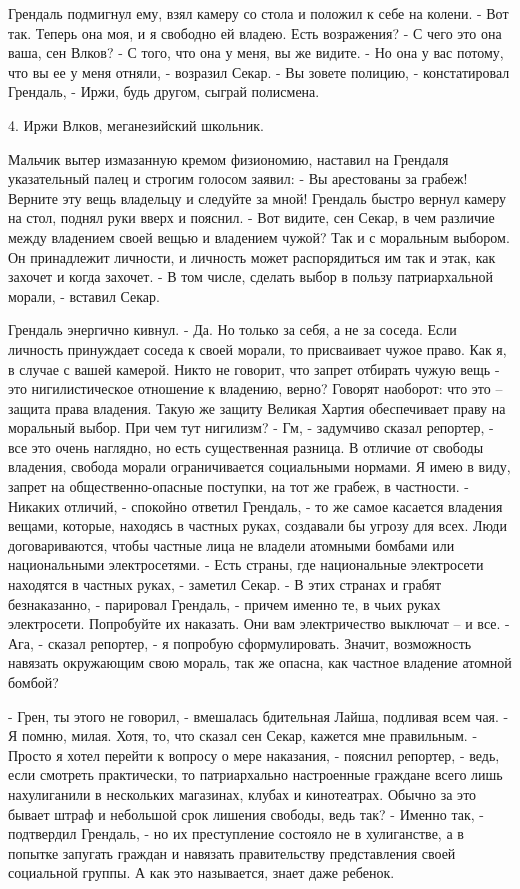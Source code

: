 \documentclass{book}
\begin{document}
Грендаль подмигнул ему, взял камеру со стола и положил к себе на колени.
- Вот так. Теперь она моя, и я свободно ей владею. Есть возражения?
- С чего это она ваша, сен Влков?
- С того, что она у меня, вы же видите.
- Но она у вас потому, что вы ее у меня отняли, - возразил Секар.
- Вы зовете полицию, - констатировал Грендаль, - Иржи, будь другом, сыграй полисмена.


4. Иржи Влков, меганезийский школьник.


Мальчик вытер измазанную кремом физиономию, наставил на Грендаля указательный палец и строгим голосом заявил:
- Вы арестованы за грабеж! Верните эту вещь владельцу и следуйте за мной!
Грендаль быстро вернул камеру на стол, поднял руки вверх и пояснил.
- Вот видите, сен Секар, в чем различие между владением своей вещью и владением чужой? Так и с моральным выбором. Он принадлежит личности, и личность может распорядиться им так и этак, как захочет и когда захочет.
- В том числе, сделать выбор в пользу патриархальной морали, - вставил Секар.

Грендаль энергично кивнул.
- Да. Но только за себя, а не за соседа. Если личность принуждает соседа к своей морали, то присваивает чужое право. Как я, в случае с вашей камерой. Никто не говорит, что запрет отбирать чужую вещь - это нигилистическое отношение к владению, верно? Говорят наоборот: что это -- защита права владения. Такую же защиту Великая Хартия обеспечивает праву на моральный выбор. При чем тут нигилизм?
- Гм, - задумчиво сказал репортер, - все это очень наглядно, но есть существенная разница. В отличие от свободы владения, свобода морали ограничивается социальными нормами. Я имею в виду, запрет на общественно-опасные поступки, на тот же грабеж, в частности.
- Никаких отличий, - спокойно ответил Грендаль, - то же самое касается владения вещами, которые, находясь в частных руках, создавали бы угрозу для всех. Люди договариваются, чтобы частные лица не владели атомными бомбами или национальными электросетями.
- Есть страны, где национальные электросети находятся в частных руках, - заметил Секар.
- В этих странах и грабят безнаказанно, - парировал Грендаль, - причем именно те, в чьих руках электросети. Попробуйте их наказать. Они вам электричество выключат -- и все.
- Ага, - сказал репортер, - я попробую сформулировать. Значит, возможность навязать окружающим свою мораль, так же опасна, как частное владение атомной бомбой?

- Грен, ты этого не говорил, - вмешалась бдительная Лайша, подливая всем чая.
- Я помню, милая. Хотя, то, что сказал сен Секар, кажется мне правильным.
- Просто я хотел перейти к вопросу о мере наказания, - пояснил репортер, - ведь, если смотреть практически, то патриархально настроенные граждане всего лишь нахулиганили в нескольких магазинах, клубах и кинотеатрах. Обычно за это бывает штраф и небольшой срок лишения свободы, ведь так?
- Именно так, - подтвердил Грендаль, - но их преступление состояло не в хулиганстве, а в попытке запугать граждан и навязать правительству представления своей социальной группы. А как это называется, знает даже ребенок.
\end{document}
